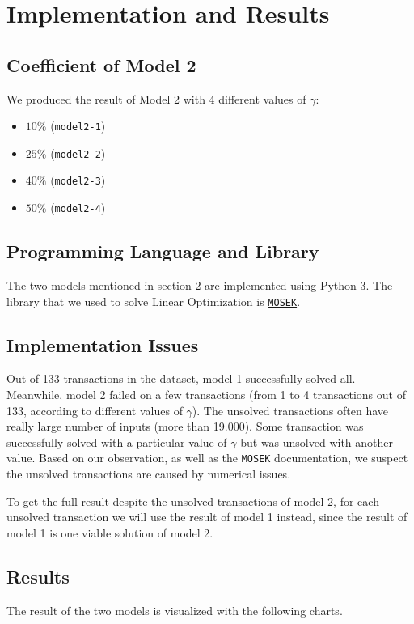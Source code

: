 \section{Implementation and Results}
  \subsection{Coefficient of Model 2}
    \par We produced the result of Model 2 with 4 different values of $\gamma$:
    \begin{itemize}
      \item $10\%$ (\texttt{model2-1})
      \item $25\%$ (\texttt{model2-2})
      \item $40\%$ (\texttt{model2-3})
      \item $50\%$ (\texttt{model2-4})
    \end{itemize}

  \subsection{Programming Language and Library}
    \par The two models mentioned in section 2 are implemented using Python 3. The library that we used to solve Linear Optimization is \href{https://www.mosek.com/}{\texttt{MOSEK}}.

  \subsection{Implementation Issues}
    \par Out of 133 transactions in the dataset, model 1 successfully solved all. Meanwhile, model 2 failed on a few transactions (from 1 to 4 transactions out of 133, according to different values of $\gamma$). The unsolved transactions often have really large number of inputs (more than 19.000). Some transaction was successfully solved with a particular value of $\gamma$ but was unsolved with another value. Based on our observation, as well as the \texttt{MOSEK} documentation, we suspect the unsolved transactions are caused by numerical issues.
    \par To get the full result despite the unsolved transactions of model 2, for each unsolved transaction we will use the result of model 1 instead, since the result of model 1 is one viable solution of model 2.

  \subsection{Results}
    \par The result of the two models is visualized with the following charts.
